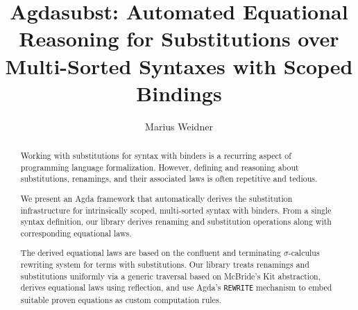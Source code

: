 \documentclass[screen,nonacm]{acmart}
\begin{document}
\title{Agdasubst: Automated Equational Reasoning for Substitutions over Multi-Sorted Syntaxes with Scoped Bindings}

\author{Marius Weidner}

\begin{abstract}
  Working with substitutions for syntax with binders is a recurring aspect of
  programming language formalization. However, defining and reasoning about
  substitutions, renamings, and their associated laws is often repetitive and
  tedious.

  We present an Agda framework that automatically derives the substitution
  infrastructure for intrinsically scoped, multi-sorted syntax with binders. From
  a single syntax definition, our library derives renaming and substitution
  operations along with corresponding equational laws.

  The derived equational laws are based on the confluent and terminating
  \(\sigma\)-calculus rewriting system for terms with substitutions. Our library
  treats renamings and substitutions uniformly via a generic traversal based on
  McBride’s Kit abstraction, derives equational laws using reflection, and use Agda’s \texttt{REWRITE} mechanism to embed
  suitable proven equations as custom computation rules.
\end{abstract}
\end{document}
